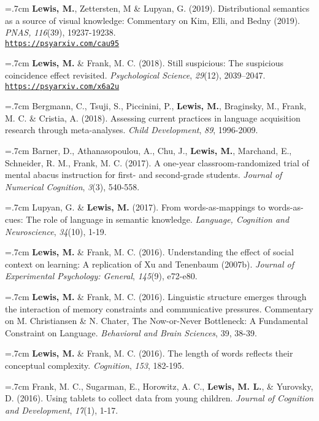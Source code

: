 \documentclass[letterpaper]{article}
\begin{document}
\hangindent=.7cm {\bf Lewis, M.}, Zettersten, M \& Lupyan, G. (2019).  Distributional semantics as a source of visual knowledge: Commentary on Kim, Elli, and Bedny (2019).  {\it PNAS,} {\it 116}(39), 19237-19238. \\ \href{https://psyarxiv.com/cau95}{\tt https://psyarxiv.com/cau95}

\hangindent=.7cm {\bf Lewis, M.} \& Frank, M. C. (2018). Still suspicious: The suspicious coincidence effect revisited.  {\it Psychological Science}, {\it 29}(12), 2039--2047. \href{https://psyarxiv.com/x6a2u}{\tt https://psyarxiv.com/x6a2u}

\hangindent=.7cm Bergmann, C., Tsuji, S., Piccinini, P., {\bf Lewis, M.}, Braginsky, M., Frank, M. C. \& Cristia, A. (2018). Assessing current practices in language acquisition research through meta-analyses. {\it Child Development},  {\it 89}, 1996-2009.

\hangindent=.7cm Barner, D., Athanasopoulou, A., Chu, J., {\bf Lewis, M.}, Marchand, E., Schneider, R. M., Frank, M. C. (2017). A one-year classroom-randomized trial of mental abacus instruction for first- and second-grade students.  {\it Journal of Numerical Cognition}, {\it  3}(3), 540-558.

\hangindent=.7cm Lupyan, G. \& {\bf Lewis, M.} (2017). From words-as-mappings to words-as-cues: The role of language in semantic knowledge. {\it Language, Cognition and Neuroscience}, {\it 34}(10), 1-19.

  \hangindent=.7cm {\bf Lewis, M.} \& Frank, M. C. (2016). Understanding the effect of social context on learning: A replication of Xu and Tenenbaum (2007b). {\it Journal of Experimental Psychology: General}, {\it 145}(9), e72-e80.

 \hangindent=.7cm {\bf Lewis, M.} \& Frank, M. C. (2016). Linguistic structure emerges through the interaction of memory constraints and communicative pressures. Commentary on M. Christiansen \& N. Chater, The Now-or-Never Bottleneck: A Fundamental Constraint on Language. {\it Behavioral and Brain Sciences}, 39, 38-39.

  \hangindent=.7cm {\bf Lewis, M.} \& Frank, M. C. (2016). The length of words reflects their conceptual complexity. {\it Cognition}, {\it 153}, 182-195.

 \hangindent=.7cm Frank, M. C., Sugarman, E., Horowitz, A. C., {\bf Lewis, M. L.}, \& Yurovsky, D. (2016). Using tablets to collect data from young children. {\it Journal of Cognition and Development}, {\it 17}(1), 1-17.
\end{document}
